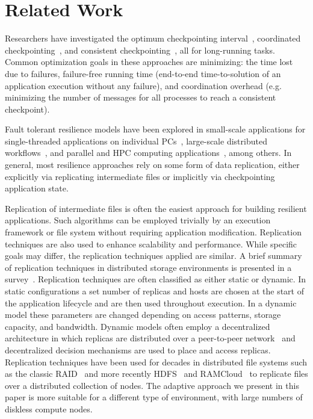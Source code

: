 \documentclass{sig-alternate}
\newcommand{\zhaonote}[1]{{\textcolor{cyan}    { ***Zhao:      #1 }}}
\newcommand{\zhaonote}[1]{}
\begin{document}
\section{Related Work}
\label{sec:Related}
Researchers have investigated the optimum checkpointing interval~\cite{young1974first, daly2006higher}, coordinated checkpointing~\cite{chandy1985distributed}, and consistent checkpointing~\cite{elnozahy1992performance}, all for long-running tasks.  Common optimization goals in these approaches are minimizing: the time lost due to failures, failure-free running time (end-to-end time-to-solution of an application execution without any failure), and coordination overhead (e.g. minimizing the number of messages for all processes to reach a consistent checkpoint). 

Fault tolerant resilience models have been explored in small-scale applications for single-threaded applications on individual PCs~\cite{condor1988, libckpt1994}, large-scale distributed workflows~\cite{uncoordinated2010}, and parallel and HPC computing applications~\cite{mist1995, consistent1994,FTworkshop2009}, among others. In  general, most resilience approaches rely on some form of data replication, either explicitly via replicating intermediate files or implicitly via checkpointing application state.

Replication of intermediate files is often the easiest approach for building resilient applications. Such algorithms can be employed trivially by an execution framework or file system without requiring application modification. Replication techniques are also used to enhance scalability and performance. While specific goals may differ, the replication techniques applied are similar. A brief summary of replication techniques in distributed storage environments is presented in a survey~\cite{survey2012}. Replication techniques are often classified as either static or dynamic. In static configurations a set number of replicas and hosts are chosen at the start of the application lifecycle and are then used throughout execution. In a dynamic model these parameters are changed depending on access patterns, storage capacity, and bandwidth.  Dynamic models often employ a decentralized architecture in which replicas are distributed over a peer-to-peer network~\cite{chord} and decentralized decision mechanisms are used to place and access replicas. Replication techniques have been used for decades in distributed file systems such as the classic RAID~\cite{raid1988} and more recently HDFS~\cite{HDFS} and RAMCloud~\cite{ramcloud2010, ramcloud2014} to replicate files over a distributed collection of nodes. %
The adaptive approach we present in this paper is more suitable for a different type of environment, with large numbers of diskless compute nodes.
\end{document}
